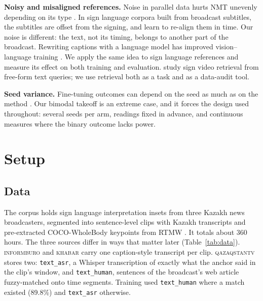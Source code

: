 \documentclass[11pt,twocolumn,a4paper]{article}
\newcommand{\src}[1]{\textsc{#1}}
\newcommand{\ib}{\src{informburo}}
\newcommand{\kh}{\src{khabar}}
\newcommand{\qz}{\src{qazaqstantv}}
\renewcommand{\paragraph}[1]{\par\smallskip\noindent\textbf{#1}\hspace{0.5em}}
\begin{document}
\paragraph{Noisy and misaligned references.}
Noise in parallel data hurts NMT unevenly depending on its type \citep{khayrallah2018noise}. In sign language corpora built from broadcast subtitles, the subtitles are offset from the signing, and \citet{bull2021aligning} learn to re-align them in time. Our noise is different: the text, not its timing, belongs to another part of the broadcast. Rewriting captions with a language model has improved vision--language training \citep{fan2023laclip}. We apply the same idea to sign language references and measure its effect on both training and evaluation. \citet{duarte2022retrieval} study sign video retrieval from free-form text queries; we use retrieval both as a task and as a data-audit tool.

\paragraph{Seed variance.}
Fine-tuning outcomes can depend on the seed as much as on the method \citep{dodge2020finetuning,bouthillier2021variance}. Our bimodal takeoff is an extreme case, and it forces the design used throughout: several seeds per arm, readings fixed in advance, and continuous measures where the binary outcome lacks power.

\section{Setup}

\subsection{Data}
\label{sec:data}

The corpus holds sign language interpretation insets from three Kazakh news broadcasters, segmented into sentence-level clips with Kazakh transcripts and pre-extracted COCO-WholeBody keypoints \citep{jin2020wholebody} from RTMW \citep{jiang2024rtmw}. It totals about 360 hours. The three sources differ in ways that matter later (Table~\ref{tab:data}). \ib{} and \kh{} carry one caption-style transcript per clip. \qz{} stores two: \texttt{text\_asr}, a Whisper transcription \citep{radford2023whisper} of exactly what the anchor said in the clip's window, and \texttt{text\_human}, sentences of the broadcast's web article fuzzy-matched onto time segments. Training used \texttt{text\_human} where a match existed (89.8\%) and \texttt{text\_asr} otherwise.
\end{document}
